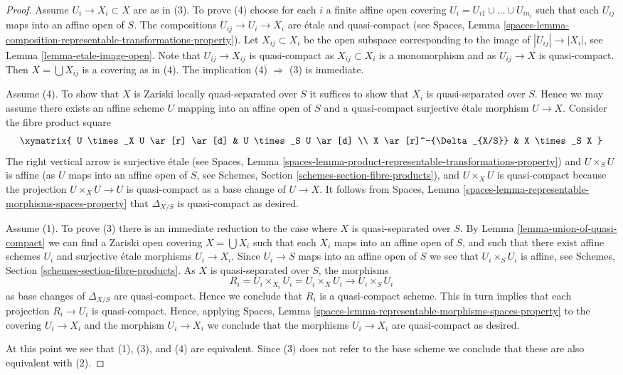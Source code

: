 \begin{proof}
Assume  $U_i \to X_i \subset X$ are as in (3). To prove (4)
choose for each $i$ a finite affine open covering $U_i =
U_{i1} \cup \ldots \cup U_{in_i}$ such that each $U_{ij}$ maps
into an affine open of $S$. The compositions
$U_{ij} \to U_i \to X_i$ are \'etale and quasi-compact (see
Spaces, Lemma
\ref{spaces-lemma-composition-representable-transformations-property}).
Let $X_{ij} \subset X_i$ be the open subspace corresponding to
the image of $|U_{ij}| \to |X_i|$, see
Lemma \ref{lemma-etale-image-open}.
Note that $U_{ij} \to X_{ij}$ is quasi-compact as $X_{ij} \subset X_i$
is a monomorphism and as $U_{ij} \to X$ is quasi-compact.
Then $X = \bigcup X_{ij}$ is a covering as in (4).
The implication (4) $\Rightarrow$ (3) is immediate.

\medskip\noindent
Assume (4). To show that $X$ is Zariski locally quasi-separated over $S$
it suffices to show that $X_i$ is quasi-separated over $S$.
Hence we may assume there exists an affine scheme $U$ mapping into
an affine open of $S$ and a quasi-compact surjective \'etale
morphism $U \to X$. Consider the fibre product square
$$
\xymatrix{
U \times_X U \ar[r] \ar[d] & U \times_S U \ar[d] \\
X \ar[r]^-{\Delta_{X/S}} & X \times_S X
}
$$
The right vertical arrow is surjective \'etale (see
Spaces, Lemma
\ref{spaces-lemma-product-representable-transformations-property})
and $U \times_S U$ is affine (as $U$ maps into an affine open of $S$, see
Schemes, Section \ref{schemes-section-fibre-products}),
and $U \times_X U$ is quasi-compact
because the projection $U \times_X U \to U$ is quasi-compact as a
base change of $U \to X$. It follows from
Spaces, Lemma \ref{spaces-lemma-representable-morphisms-spaces-property}
that $\Delta_{X/S}$ is quasi-compact as desired.

\medskip\noindent
Assume (1). To prove (3) there is an immediate reduction to the case
where $X$ is quasi-separated over $S$. By
Lemma \ref{lemma-union-of-quasi-compact}
we can find a Zariski open covering $X = \bigcup X_i$ such that each
$X_i$ maps into an affine open of $S$, and such that there exist affine
schemes $U_i$ and surjective \'etale morphisms $U_i \to X_i$.
Since $U_i \to S$ maps into an affine open of $S$ we see that
$U_i \times_S U_i$ is affine, see
Schemes, Section \ref{schemes-section-fibre-products}.
As $X$ is quasi-separated over $S$, the morphisms
$$
R_i = U_i \times_{X_i} U_i = U_i \times_X U_i
\longrightarrow
U_i \times_S U_i
$$
as base changes of $\Delta_{X/S}$ are quasi-compact. Hence we conclude
that $R_i$ is a quasi-compact scheme. This in turn implies that each
projection $R_i \to U_i$ is quasi-compact. Hence, applying
Spaces, Lemma \ref{spaces-lemma-representable-morphisms-spaces-property}
to the covering $U_i \to X_i$ and the morphism $U_i \to X_i$
we conclude that the morphisms $U_i \to X_i$ are quasi-compact as desired.

\medskip\noindent
At this point we see that (1), (3), and (4) are equivalent. Since (3) does
not refer to the base scheme we conclude that these are also equivalent
with (2).
\end{proof}








